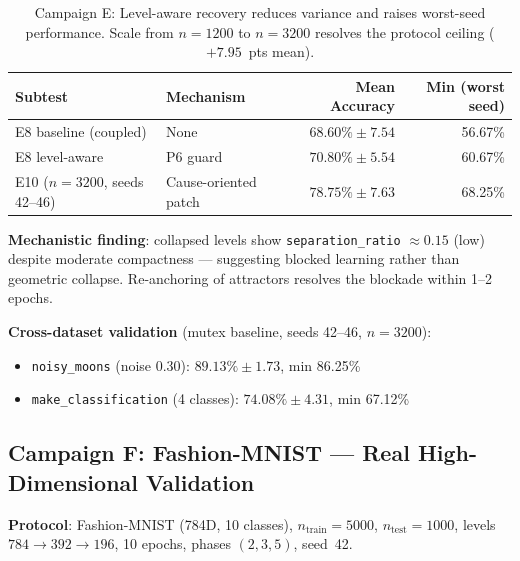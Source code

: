 \documentclass[11pt,a4paper]{article}
\begin{document}
\begin{table}[h]
\centering
\begin{tabular}{llrr}
\toprule
\textbf{Subtest} & \textbf{Mechanism} & \textbf{Mean Accuracy} & \textbf{Min (worst seed)} \\
\midrule
E8 baseline (coupled)   & None                   & $68.60\% \pm 7.54$ & 56.67\% \\
E8 level-aware          & P6 guard               & $70.80\% \pm 5.54$ & 60.67\% \\
\midrule
E10 ($n=3200$, seeds 42--46) & Cause-oriented patch & $78.75\% \pm 7.63$ & 68.25\% \\
\bottomrule
\end{tabular}
\caption{Campaign E: Level-aware recovery reduces variance and raises worst-seed performance.
Scale from $n=1200$ to $n=3200$ resolves the protocol ceiling ($+7.95$~pts mean).}
\label{tab:campaign_e}
\end{table}

\textbf{Mechanistic finding}: collapsed levels show \texttt{separation\_ratio} $\approx 0.15$
(low) despite moderate compactness --- suggesting blocked learning rather than geometric
collapse.  Re-anchoring of attractors resolves the blockade within 1--2 epochs.

\textbf{Cross-dataset validation} (mutex baseline, seeds 42--46, $n=3200$):
\begin{itemize}
  \item \texttt{noisy\_moons} (noise 0.30): $89.13\% \pm 1.73$, min 86.25\%
  \item \texttt{make\_classification} (4 classes): $74.08\% \pm 4.31$, min 67.12\%
\end{itemize}

\subsection{Campaign F: Fashion-MNIST --- Real High-Dimensional Validation}

\textbf{Protocol}: Fashion-MNIST (784D, 10 classes), $n_{\mathrm{train}}=5000$,
$n_{\mathrm{test}}=1000$, levels $784 \to 392 \to 196$, 10 epochs, phases $(2,3,5)$, seed~42.
\end{document}
